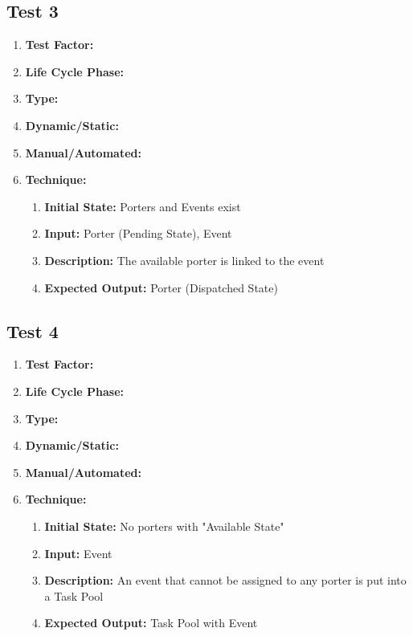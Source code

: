 \documentclass[paper=letter, fontsize=10pt]{scrartcl}
\numberwithin{equation}{section}		%
\numberwithin{figure}{section}			%
\numberwithin{table}{section}				%
\begin{document}
\subsection{Test 3}
\begin{enumerate}[a]
	\item \textbf{Test Factor:}  
	\item \textbf{Life Cycle Phase:}
	\item \textbf{Type:}
	\item \textbf{Dynamic/Static:}
	\item \textbf{Manual/Automated:}
	\item \textbf{Technique:}
		\begin{enumerate}[i]
			\item \textbf{Initial State:} Porters and Events exist
			\item \textbf{Input:} Porter (Pending State), Event
			\item \textbf{Description:} The available porter is linked to the event
			\item \textbf{Expected Output:} Porter (Dispatched State)
		\end{enumerate}
\end{enumerate}

\subsection{Test 4}
\begin{enumerate}[a]
	\item \textbf{Test Factor:}  
	\item \textbf{Life Cycle Phase:}
	\item \textbf{Type:}
	\item \textbf{Dynamic/Static:}
	\item \textbf{Manual/Automated:}
	\item \textbf{Technique:}
		\begin{enumerate}[i]
			\item \textbf{Initial State:} No porters with "Available State" 
			\item \textbf{Input:} Event
			\item \textbf{Description:} An event that cannot be assigned to any porter is put into a Task Pool
			\item \textbf{Expected Output:} Task Pool with Event
		\end{enumerate}
\end{enumerate}
\end{document}
